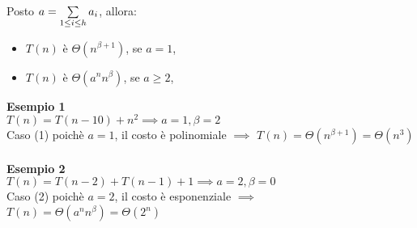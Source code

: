 \documentclass[../cheatSheetAlgoritmi.tex]{subfiles}
\begin{document}
Posto $a = \sum\limits_{1 \leq i \leq h} {a \textsubscript{$i$}}$, allora: 

\begin{itemize}
	\item $T(n)$ è $\Theta(n^{\beta+1})$, se $a = 1$,
	\item $T(n)$ è $\Theta(a^{n}n^{\beta})$, se $a \geq 2$,
\end{itemize}
\textbf{Esempio 1}\\
$T(n) = T(n - 10) + n^{2} \implies a = 1, \beta = 2$\\
Caso (1) poichè $a = 1$, il costo è polinomiale $\implies$ $T(n) = \Theta(n^{\beta+1}) = \Theta(n^{3})$\\\\
\textbf{Esempio 2}\\
$T(n) = T(n - 2) +  T(n - 1) + 1 \implies a = 2, \beta = 0$\\
Caso (2) poichè $a = 2$, il costo è esponenziale $\implies$ $T(n) = \Theta(a^{n}n^{\beta}) = \Theta(2^n)$
\end{document}

